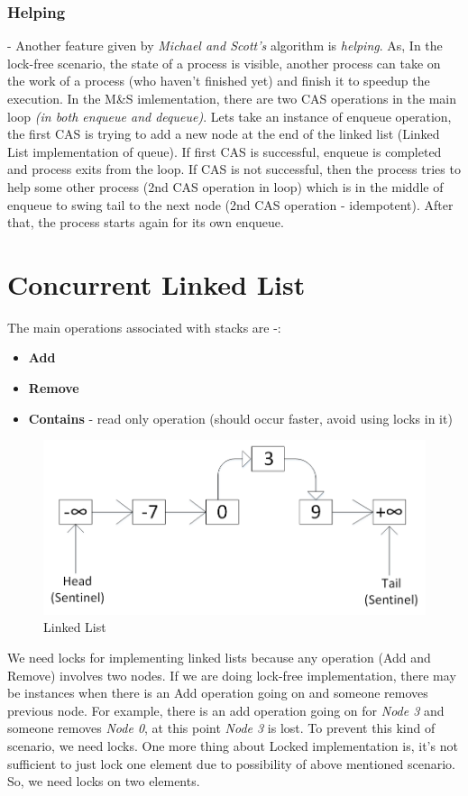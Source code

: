 \documentclass[twoside]{article}
\begin{document}
\subsubsection{Helping} - Another feature given by \textit{Michael and Scott's} algorithm is \textit{helping}. As, In the lock-free scenario, the state of a process is visible, another process can take on the work of a process (who haven't finished yet) and finish it to speedup the execution.
In the M\&S imlementation, there are two CAS operations in the main loop \textit{(in both enqueue and dequeue)}. Lets take an instance of enqueue operation, the first CAS is trying to add a new node at the end of the linked list (Linked List implementation of queue). If first CAS is successful, enqueue is completed and process exits from the loop. If CAS is not successful, then the process tries to help some other process (2nd CAS operation in loop) which is in the middle of enqueue to swing tail to the next node (2nd CAS operation - idempotent). After that, the process starts again for its own enqueue.

\section{Concurrent Linked List}
The main operations associated with stacks are -:
\begin{itemize}
    \item \textbf{Add}
    \item \textbf{Remove}
    \item \textbf{Contains} - read only operation (should occur faster, avoid using locks in it)
\end{itemize}

 \begin{figure}[H]
\centering
\includegraphics[scale=0.8]{LL}
\caption{Linked List}
\label{fig:2}
\end{figure}

We need locks for implementing linked lists because any operation (Add and Remove) involves two nodes. If we are doing lock-free implementation, there may be instances when there is an Add operation going on and someone removes previous node. For example, there is an add operation going on for \textit{Node 3} and someone removes \textit{Node 0}, at this point \textit{Node 3} is lost. To prevent this kind of scenario, we need locks. One more thing about Locked implementation is, it's not sufficient to just lock one element due to possibility of above mentioned scenario. So, we need locks on two elements.
\end{document}
